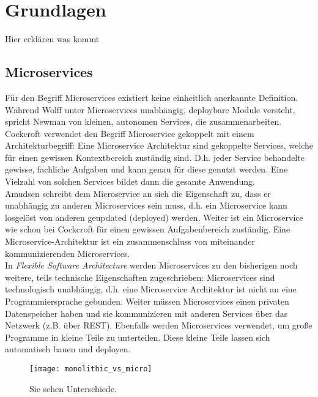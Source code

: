 
\section{Grundlagen}

Hier erklären was kommt

\subsection{Microservices}

Für den Begriff Microservices existiert keine einheitlich anerkannte Definition. Während Wolff unter Microservices unabhängig, deploybare Module versteht, spricht Newman von kleinen, autonomen Services, die zusammenarbeiten. Cockcroft verwendet den Begriff Microservice gekoppelt mit einem Architekturbegriff: Eine Microservice Architektur sind gekoppelte Services, welche für einen gewissen Kontextbereich zuständig sind. D.h. jeder Service behandelte gewisse, fachliche Aufgaben und kann genau für diese genutzt werden. Eine Vielzahl von solchen Services bildet dann die gesamte Anwendung. \\

Amudsen schreibt dem Microservice an sich die Eigenschaft zu, dass er unabhängig zu anderen Microservices sein muss, d.h. ein Microservice kann losgelöst von anderen geupdated (deployed) werden. Weiter ist ein Microservice wie schon bei Cockcroft für einen gewissen Aufgabenbereich zuständig. Eine Microservice-Architektur ist ein zusammenschluss von miteinander kommunizierenden Microservices. \\

In \textit{Flexible Software Architecture} werden Microservices zu den bisherigen noch weitere, teils technische Eigenschaften zugeschrieben: Microservices sind technologisch unabhängig, d.h. eine Microservice Architektur ist nicht an eine Programmiersprache gebunden. Weiter müssen Microservices einen privaten Datenspeicher haben und sie kommunizieren mit anderen Services über das Netzwerk (z.B. über REST). Ebenfalls werden Microservices verwendet, um große Programme in kleine Teile zu unterteilen. Diese kleine Teile lassen sich automatisch bauen und deployen.  

%
%

\begin{figure}[ht]
	\centering
	\texttt{[image: monolithic\_vs\_micro]}
	\caption{Sie sehen Unterschiede.\cite{nhiem2017mic_moving}}
	\label{fig:trigo_funk}
\end{figure}